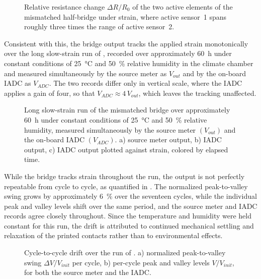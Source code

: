 \begin{figure}[!b]
\centering

    \caption{Relative resistance change \(\Delta R/R_0\) of the two active elements of the mismatched half-bridge under strain, where active sensor~1 spans roughly three times the range of active sensor~2.}
    \label{fig:finalWheatstoneSensorer}
\end{figure}

Consistent with this, the bridge output tracks the applied strain monotonically over the long slow-strain run of , recorded over approximately \SI{60}{\hour} under constant conditions of \SI{25}{\celsius} and \SI{50}{\percent} relative humidity in the climate chamber and measured simultaneously by the source meter as \(V_{out}\) and by the on-board IADC as \(V_{ADC}\). The two records differ only in vertical scale, where the IADC applies a gain of four, so that \(V_{ADC}\approx 4\,V_{out}\), which leaves the tracking unaffected.

\begin{figure}[!t]
\centering

    \caption{Long slow-strain run of the mismatched bridge over approximately \SI{60}{\hour} under constant conditions of \SI{25}{\celsius} and \SI{50}{\percent} relative humidity, measured simultaneously by the source meter \(\left(V_{out}\right)\) and the on-board IADC \(\left(V_{ADC}\right)\). a) source meter output, b) IADC output, c) IADC output plotted against strain, colored by elapsed time.}
    \label{fig:Slope1}
\end{figure}

While the bridge tracks strain throughout the run, the output is not perfectly repeatable from cycle to cycle, as quantified in . The normalized peak-to-valley swing grows by approximately \SI{6}{\percent} over the seventeen cycles, while the individual peak and valley levels shift over the same period, and the source meter and IADC records agree closely throughout. Since the temperature and humidity were held constant for this run, the drift is attributed to continued mechanical settling and relaxation of the printed contacts rather than to environmental effects.

\pagebreak

\begin{figure}
\centering

    \caption{Cycle-to-cycle drift over the run of . a) normalized peak-to-valley swing \(\Delta V/V_{init}\) per cycle, b) per-cycle peak and valley levels \(V/V_{init}\), for both the source meter and the IADC.}
    \label{fig:Slope2}
\end{figure}

